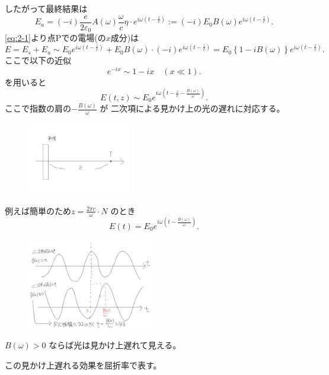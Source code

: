\documentclass[dvipdfmx,12pt]{jsarticle}
\begin{document}
したがって最終結果は
\begin{equation}
\label{eq:2-9}
	E_a=(-i)\frac{e}{2\varepsilon_0}A(\omega) \frac{\omega}{c}\eta\cdot  e^{i\omega(t-\frac{z}{c})}:=(-i)E_0B(\omega)e^{i\omega(t-\frac{z}{c})}
.\end{equation}
\eqref{eq:2-1}より点Pでの電場(の$x$成分)は
\[
E=E_s+E_a\sim E_0e^{i\omega(t-\frac{z}{c})}+E_0B(\omega)\cdot (-i)e^{i\omega(t-\frac{z}{c})}=E_0\left\{ 1-iB(\omega) \right\} e^{i\omega(t-\frac{z}{c})}
.\] 
ここで以下の近似
\[
e^{-ix}\sim 1-ix\quad (x\ll 1)
.\] 
を用いると
\begin{equation}
\label{eq:2-10}
E(t,z)\sim E_0e^{i\omega(t-\frac{z}{c}-\frac{B(\omega)}{\omega})}
.\end{equation}
ここで指数の肩の$-\frac{B(\omega)}{\omega}$ が
二次項による見かけ上の光の遅れに対応する。
\begin{figure}[H]
	\centering
	\includegraphics[width=0.4\textwidth]{fig2/Fig-6.jpg}
	\label{fig:fig2-Fig-6-jpg}
\end{figure}
例えば簡単のため$z= \frac{2\pi c}{\omega}\cdot N $ のとき
\begin{equation}
\label{eq:2-11}
	E(t)=E_0e^{i\omega(t-\frac{B(\omega)}{\omega})}
.\end{equation}
\begin{figure}[H]
	\centering
	\includegraphics[width=0.5\textwidth]{fig2/Fig-7.jpg}
	\label{fig:fig2-Fig-7-jpg}
\end{figure}
\begin{tcolorbox}[colback=green!10!white]
	$B(\omega)>0$ ならば光は見かけ上遅れて見える。
\end{tcolorbox}
この見かけ上遅れる効果を屈折率で表す。
\end{document}
